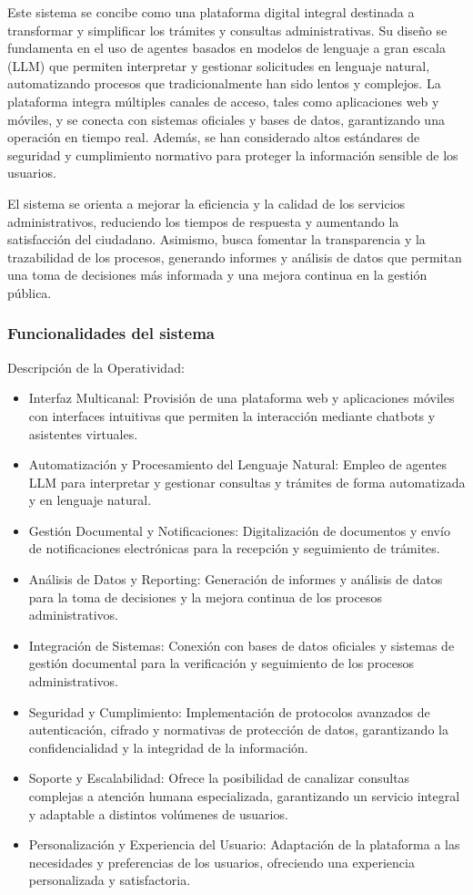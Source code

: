 Este sistema se concibe como una plataforma digital integral destinada a transformar y simplificar los trámites y consultas administrativas. Su diseño se fundamenta en el uso de agentes basados en modelos de lenguaje a gran escala (LLM) que permiten interpretar y gestionar solicitudes en lenguaje natural, automatizando procesos que tradicionalmente han sido lentos y complejos. La plataforma integra múltiples canales de acceso, tales como aplicaciones web y móviles, y se conecta con sistemas oficiales y bases de datos, garantizando una operación en tiempo real. Además, se han considerado altos estándares de seguridad y cumplimiento normativo para proteger la información sensible de los usuarios.

El sistema se orienta a mejorar la eficiencia y la calidad de los servicios administrativos, reduciendo los tiempos de respuesta y aumentando la satisfacción del ciudadano. Asimismo, busca fomentar la transparencia y la trazabilidad de los procesos, generando informes y análisis de datos que permitan una toma de decisiones más informada y una mejora continua en la gestión pública.

\subsubsection{Funcionalidades del sistema}
Descripción de la Operatividad:

\begin{itemize}
    \item Interfaz Multicanal: Provisión de una plataforma web y aplicaciones móviles con interfaces intuitivas que permiten la interacción mediante chatbots y asistentes virtuales.
    \item Automatización y Procesamiento del Lenguaje Natural: Empleo de agentes LLM para interpretar y gestionar consultas y trámites de forma automatizada y en lenguaje natural.
    \item Gestión Documental y Notificaciones: Digitalización de documentos y envío de notificaciones electrónicas para la recepción y seguimiento de trámites.
    \item Análisis de Datos y Reporting: Generación de informes y análisis de datos para la toma de decisiones y la mejora continua de los procesos administrativos.
    \item Integración de Sistemas: Conexión con bases de datos oficiales y sistemas de gestión documental para la verificación y seguimiento de los procesos administrativos.
    \item Seguridad y Cumplimiento: Implementación de protocolos avanzados de autenticación, cifrado y normativas de protección de datos, garantizando la confidencialidad y la integridad de la información.
    \item Soporte y Escalabilidad: Ofrece la posibilidad de canalizar consultas complejas a atención humana especializada, garantizando un servicio integral y adaptable a distintos volúmenes de usuarios.
    \item Personalización y Experiencia del Usuario: Adaptación de la plataforma a las necesidades y preferencias de los usuarios, ofreciendo una experiencia personalizada y satisfactoria.
\end{itemize}

